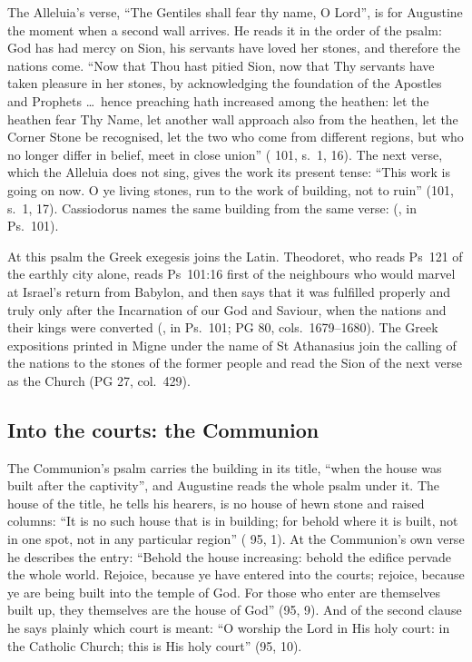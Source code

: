 The Alleluia's verse, ``The Gentiles shall fear thy name, O Lord'', is for
Augustine the moment when a second wall arrives. He reads it in the order of
the psalm: God has had mercy on Sion, his servants have loved her stones, and
therefore the nations come. ``Now that Thou hast pitied Sion, now that Thy
servants have taken pleasure in her stones, by acknowledging the foundation of
the Apostles and Prophets \dots\ hence preaching hath increased among the
heathen: let the heathen fear Thy Name, let another wall approach also from the
heathen, let the Corner Stone be recognised, let the two who come from
different regions, but who no longer differ in belief, meet in close union''
( 101, s.~1, 16). The next verse, which the
Alleluia does not sing, gives the work its present tense: ``This work is going
on now. O ye living stones, run to the work of building, not to ruin'' (101,
s.~1, 17). Cassiodorus names the same building from the same verse:
 (, in Ps.~101).

At this psalm the Greek exegesis joins the Latin. Theodoret, who reads Ps~121
of the earthly city alone, reads Ps~101:16 first of the neighbours who would
marvel at Israel's return from Babylon, and then says that it was fulfilled
properly and truly only after the Incarnation of our God and Saviour, when the
nations and their kings were converted (, in
Ps.~101; PG 80, cols.~1679--1680). The Greek expositions printed in Migne under
the name of St Athanasius join the calling of the nations to the stones of the
former people and read the Sion of the next verse as the Church (PG 27,
col.~429).

\subsection{Into the courts: the Communion}

The Communion's psalm carries the building in its title, ``when the house was
built after the captivity'', and Augustine reads the whole psalm under it. The
house of the title, he tells his hearers, is no house of hewn stone and raised
columns: ``It is no such house that is in building; for behold where it is
built, not in one spot, not in any particular region'' ( 95, 1). At the Communion's own verse he describes the entry: ``Behold
the house increasing: behold the edifice pervade the whole world. Rejoice,
because ye have entered into the courts; rejoice, because ye are being built
into the temple of God. For those who enter are themselves built up, they
themselves are the house of God'' (95, 9). And of the second clause he says
plainly which court is meant: ``O worship the Lord in His holy court: in the
Catholic Church; this is His holy court'' (95, 10).


